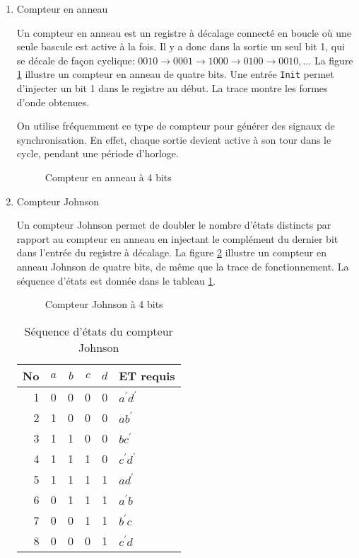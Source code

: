 \documentclass[letter, oneside]{book}
\begin{document}
\begin{enumerate}
\item Compteur en anneau
\label{sec:org8bbb607}

Un compteur en anneau est un registre à décalage connecté en boucle où
une seule bascule est active à la fois. Il y a donc dans la sortie un
seul bit 1, qui se décale de façon cyclique: \(0010 \rightarrow 0001
\rightarrow 1000 \rightarrow 0100 \rightarrow 0010, \ldots\) La
figure \ref{fig:orgd1b86f9} illustre un compteur en anneau de quatre bits. Une
entrée \texttt{Init} permet d'injecter un bit 1 dans le registre au début. La
trace montre les formes d'onde obtenues.

On utilise fréquemment ce type de compteur pour générer des signaux de
synchronisation. En effet, chaque sortie devient active à son tour
dans le cycle, pendant une période d'horloge.

\begin{figure}[htbp]
\centering

\caption{\label{fig:orgd1b86f9}Compteur en anneau à 4 bits}
\end{figure}

\item Compteur Johnson
\label{sec:orgfafefc2}

Un compteur Johnson permet de doubler le nombre d'états distincts par
rapport au compteur en anneau en injectant le complément du dernier
bit dans l'entrée du registre à décalage.  La figure \ref{fig:orge499074}
illustre un compteur en anneau Johnson de quatre bits, de même que la
trace de fonctionnement. La séquence d'états est donnée dans le
tableau \ref{tab:orgc7363d4}.


\begin{figure}[htbp]
\centering

\caption{\label{fig:orge499074}Compteur Johnson à 4 bits}
\end{figure}


\begin{table}[htbp]
\caption{\label{tab:orgc7363d4}Séquence d'états du compteur Johnson}
\centering
\begin{tabular}{rrrrrl}
No & \(a\) & \(b\) & \(c\) & \(d\) & ET requis\\[0pt]
\hline
1 & 0 & 0 & 0 & 0 & \(a^\prime d^\prime\)\\[0pt]
2 & 1 & 0 & 0 & 0 & \(a b^\prime\)\\[0pt]
3 & 1 & 1 & 0 & 0 & \(b c^\prime\)\\[0pt]
4 & 1 & 1 & 1 & 0 & \(c^\prime d^\prime\)\\[0pt]
5 & 1 & 1 & 1 & 1 & \(a d^\prime\)\\[0pt]
6 & 0 & 1 & 1 & 1 & \(a^\prime b\)\\[0pt]
7 & 0 & 0 & 1 & 1 & \(b^\prime c\)\\[0pt]
8 & 0 & 0 & 0 & 1 & \(c^\prime d\)\\[0pt]
\end{tabular}
\end{table}



\end{enumerate}
\end{document}
